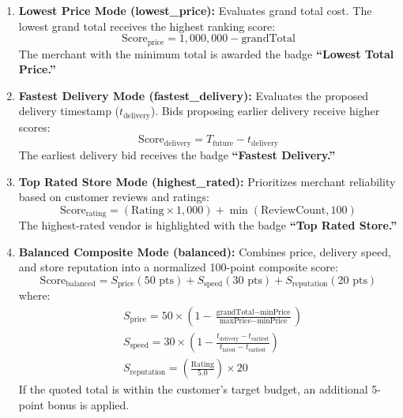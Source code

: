 \begin{enumerate}
    \item \textbf{Lowest Price Mode (lowest\_price):} Evaluates grand total cost. The lowest grand total receives the highest ranking score:
    \begin{equation}
        \text{Score}_{\text{price}} = 1{,}000{,}000 - \text{grandTotal}
    \end{equation}
    The merchant with the minimum total is awarded the badge \textbf{``Lowest Total Price.''}
    
    \item \textbf{Fastest Delivery Mode (fastest\_delivery):} Evaluates the proposed delivery timestamp ($t_{\text{delivery}}$). Bids proposing earlier delivery receive higher scores:
    \begin{equation}
        \text{Score}_{\text{delivery}} = T_{\text{future}} - t_{\text{delivery}}
    \end{equation}
    The earliest delivery bid receives the badge \textbf{``Fastest Delivery.''}
    
    \item \textbf{Top Rated Store Mode (highest\_rated):} Prioritizes merchant reliability based on customer reviews and ratings:
    \begin{equation}
        \text{Score}_{\text{rating}} = (\text{Rating} \times 1{,}000) + \min(\text{ReviewCount}, 100)
    \end{equation}
    The highest-rated vendor is highlighted with the badge \textbf{``Top Rated Store.''}
    
    \item \textbf{Balanced Composite Mode (balanced):} Combines price, delivery speed, and store reputation into a normalized 100-point composite score:
    \begin{equation}
        \text{Score}_{\text{balanced}} = S_{\text{price}} (50\text{ pts}) + S_{\text{speed}} (30\text{ pts}) + S_{\text{reputation}} (20\text{ pts})
    \end{equation}
    where:
    \begin{align}
        &S_{\text{price}} = 50 \times \left( 1 - \frac{\text{grandTotal} - \text{minPrice}}{\text{maxPrice} - \text{minPrice}} \right) \\
        &S_{\text{speed}} = 30 \times \left( 1 - \frac{t_{\text{delivery}} - t_{\text{earliest}}}{t_{\text{latest}} - t_{\text{earliest}}} \right) \\
        &S_{\text{reputation}} = \left( \frac{\text{Rating}}{5.0} \right) \times 20
    \end{align}
    If the quoted total is within the customer's target budget, an additional 5-point bonus is applied.
\end{enumerate}

